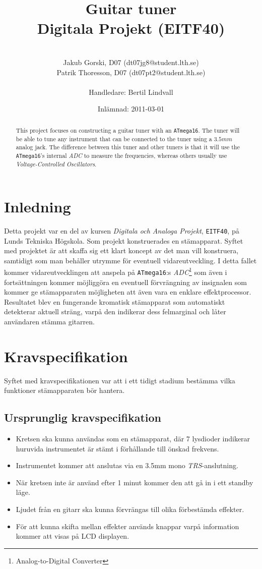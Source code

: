\documentclass[a4paper]{article}
\title{Guitar tuner \\ Digitala Projekt (EITF40)}
\author{\\Jakub Gorski, D07 (dt07jg8@student.lth.se)\\
Patrik Thoresson, D07 (dt07pt2@student.lth.se)\\\\Handledare: Bertil Lindvall}
\date{Inlämnad: 2011-03-01}
\begin{document}
\maketitle
\thispagestyle{empty}

\begin{abstract}
This project focuses on constructing a guitar tuner with an \texttt{ATmega16}. The tuner will be able to tune any instrument that can be connected to the tuner using a $3.5mm$ analog jack. The difference between this tuner and other tuners is that it will use the \texttt{ATmega16}’s internal \textit{ADC} to measure the frequencies, whereas others usually use \textit{Voltage-Controlled Oscillators}.
\end{abstract}


\newpage
\thispagestyle{empty}
\tableofcontents
\newpage
{}



\section{Inledning}
Detta projekt var en del av kursen \textit{Digitala och Analoga Projekt}, \texttt{EITF40}, på Lunds Tekniska Högskola. Som projekt konstruerades en stämapparat. Syftet med projektet är att skaffa sig ett klart koncept av det man vill konstruera, samtidigt som man behåller utrymme för eventuell vidareutveckling. I detta fallet kommer vidareutvecklingen att anspela på \texttt{ATmega16}:s \textit{ADC}\footnote{Analog-to-Digital Converter} som även i fortsättningen kommer möjliggöra en eventuell förvrängning av insignalen som kommer ge stämapparaten möjligheten att även vara en enklare effektprocessor. Resultatet blev en fungerande kromatisk stämapparat som automatiskt detekterar aktuell sträng, varpå den indikerar dess felmarginal och låter användaren stämma gitarren.

\section{Kravspecifikation}
Syftet med kravspecifikationen var att i ett tidigt stadium bestämma vilka funktioner stämapparaten bör hantera.
\subsection{Ursprunglig kravspecifikation}
\begin{itemize}
\item Kretsen ska kunna användas som en stämapparat, där 7 lysdioder indikerar huruvida instrumentet är stämt i förhållande till önskad frekvens.
\item Instrumentet kommer att anslutas via en 3.5mm mono \textit{TRS}-anslutning.
\item När kretsen inte är använd efter 1 minut kommer den att gå in i ett standby läge.
\item Ljudet från en gitarr ska kunna förvrängas till olika förbestämda effekter.
\item För att kunna skifta mellan effekter används knappar varpå information kommer att visas på LCD displayen.
\end{itemize}
\end{document}
